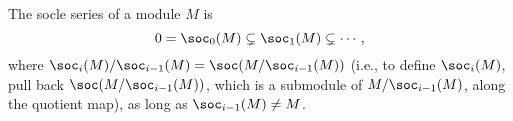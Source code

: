 The socle series of a module $M$ is
\[ 0 = \soc_0(M) \subsetneq \soc_1(M) \subsetneq \cdots, \]
where $\soc_i(M)/\soc_{i-1}(M) = \soc(M/\soc_{i-1}(M))$ (i.e., to define $\soc_i(M)$,
pull back $\soc(M/\soc_{i-1}(M))$, which is a submodule of $M/\soc_{i-1}(M)$, along the
quotient map), as long as
$\soc_{i-1}(M)\neq M$.
